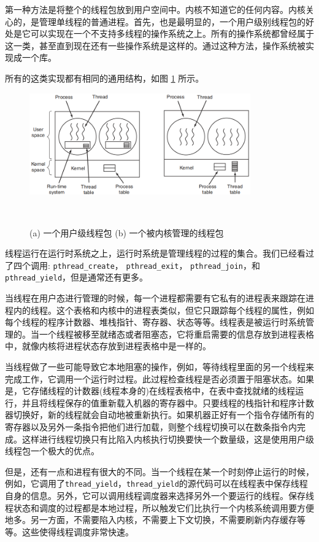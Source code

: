 	第一种方法是将整个的线程包放到用户空间中。内核不知道它的任何内容。内核关心的，是管理单线程的普通进程。首先，也是最明显的，一个用户级别线程包的好处是它可以实现在一个不支持多线程的操作系统之上。所有的操作系统都曾经属于这一类，甚至直到现在还有一些操作系统是这样的。通过这种方法，操作系统被实现成一个库。
	
	所有的这类实现都有相同的通用结构，如图 \ref{fig:threadpackage} 所示。
	
	\begin{figure}[ht]\small
		\centering
		\includegraphics[width=0.85\textwidth]{FIG/2-16.png}
		\caption{(a) 一个用户级线程包 (b) 一个被内核管理的线程包}　\label{fig:threadpackage}
	\end{figure}

	线程运行在运行时系统之上，运行时系统是管理线程的过程的集合。我们已经看过了四个调用: \texttt{pthread\_create}， \texttt{pthread\_exit}， \texttt{pthread\_join}，和\texttt{pthread\_yield}，但是通常还有更多。
	
	当线程在用户态进行管理的时候，每一个进程都需要有它私有的进程表来跟踪在进程内的线程。这个表格和内核中的进程表类似，但它只跟踪每个线程的属性，例如每个线程的程序计数器、堆栈指针、寄存器、状态等等。线程表是被运行时系统管理的。当一个线程被移至就绪态或者阻塞态，它将重启需要的信息存放到进程表格中，就像内核将进程状态存放到进程表格中是一样的。
	
	当线程做了一些可能导致它本地阻塞的操作，例如，等待线程里面的另一个线程来完成工作，它调用一个运行时过程。此过程检查线程是否必须置于阻塞状态。如果是，它存储线程的计数器(线程本身的)在线程表格中，在表中查找就绪的线程运行，并且将线程保存的值重新载入机器的寄存器中。只要线程的栈指针和程序计数器切换好，新的线程就会自动地被重新执行。如果机器正好有一个指令存储所有的寄存器以及另外一条指令把他们进行加载，则整个线程切换可以在数条指令内完成。这样进行线程切换只有比陷入内核执行切换要快一个数量级，这是使用用户级线程包一个极大的优点。
	
	但是，还有一点和进程有很大的不同。当一个线程在某一个时刻停止运行的时候，例如，它调用了\texttt{thread\_yield}，\texttt{thread\_yield}的源代码可以在线程表中保存线程自身的信息。另外，它可以调用线程调度器来选择另外一个要运行的线程。保存线程状态和调度的过程都是本地过程，所以触发它们比执行一个内核系统调用要方便地多。另一方面，不需要陷入内核，不需要上下文切换，不需要刷新内存缓存等等。这些使得线程调度非常快速。
	
